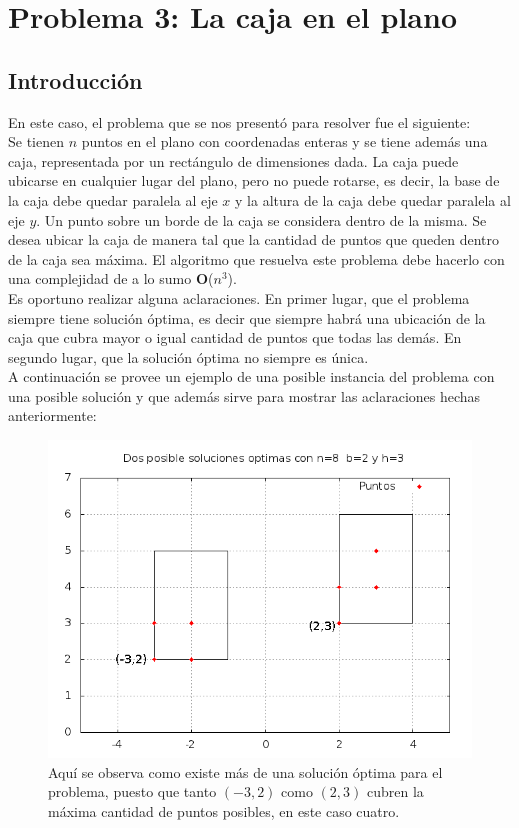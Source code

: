 \section{Problema 3: La caja en el plano}

\subsection{Introducci\'on}

\indent En este caso, el problema que se nos presentó para resolver fue el siguiente:\\
\indent Se tienen $n$ puntos en el plano con coordenadas enteras y se tiene adem\'as una caja, representada por un rect\'angulo de dimensiones dada. La caja puede ubicarse en cualquier lugar del plano, pero no puede rotarse, es decir, la base de la caja debe quedar paralela al eje $x$ y la altura de la caja debe quedar paralela al eje $y$. Un punto sobre un borde de la caja se considera dentro de la misma. Se desea ubicar la caja de manera tal que la cantidad de puntos que queden dentro de la caja sea m\'axima. El algoritmo que resuelva este problema debe hacerlo con una complejidad de a lo sumo \textbf{O}($n^{3}$).\\
\indent Es oportuno realizar alguna aclaraciones. En primer lugar, que el problema siempre tiene soluci\'on \'optima, es decir que siempre habr\'a una ubicaci\'on de la caja que cubra mayor o igual cantidad de puntos que todas las dem\'as. En segundo lugar, que la soluci\'on \'optima no siempre es \'unica. \\
\indent A continuaci\'on se provee un ejemplo de una posible instancia del problema con una posible soluci\'on y que adem\'as sirve para mostrar las aclaraciones hechas anteriormente:\\


\begin{figure}[H]
	\centering
	\includegraphics[scale=0.6]{ej3-grafico1.png}
	\caption{ Aqu\'i se observa como existe más de una soluci\'on \'optima para el problema, puesto que tanto $(-3,2)$ como $(2,3)$ cubren la m\'axima cantidad de puntos posibles, en este caso cuatro.}
\end{figure}


